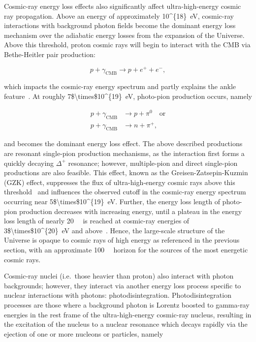 Cosmic-ray energy loss effects also significantly affect ultra-high-energy cosmic ray propagation.
Above an energy of approximately \qty[parse-numbers=false]{10^{18}}{\electronvolt}, cosmic-ray interactions with background photon fields become the dominant energy loss mechanism over the adiabatic energy losses from the expansion of the Universe.
Above this threshold, proton cosmic rays will begin to interact with the CMB via Bethe-Heitler pair production:

\begin{equation}
  p + \gamma_{\text{CMB}} \rightarrow p + e^{+} + e^{-}, \label{eq:cmb_pairproduction}
\end{equation}

\noindent
which impacts the cosmic-ray energy spectrum and partly explains the ankle feature~\cite{blumenthal_prd1970}.
At roughly \qty[parse-numbers=false]{7$\times$10^{19}}{\electronvolt}, photo-pion production occurs, namely

\begin{align}
  p + \gamma_{\text{CMB}} & \rightarrow p + \pi^{0}  \quad \text{or} \nonumber\\
  p + \gamma_{\text{CMB}} & \rightarrow n + \pi^{+}, \label{eq:cmb_photopion}
\end{align}

\noindent
and becomes the dominant energy loss effect.
The above described productions are resonant single-pion production mechanisms, as the interaction first forms a quickly decaying $\Delta^{+}$ resonance; however, multiple-pion and direct single-pion productions are also feasible.
This effect, known as the Greisen-Zatsepin-Kuzmin (GZK) effect, suppresses the flux of ultra-high-energy cosmic rays above this threshold~\cite{greisen_prl1966_gzk, zatsepin_jetp1966_gzk} and influences the observed cutoff in the cosmic-ray energy spectrum occurring near \qty[parse-numbers=false]{5$\times$10^{19}}{\electronvolt}.
Further, the energy loss length of photo-pion production decreases with increasing energy, until a plateau in the energy loss length of nearly \qty{20}{\mega\parsec} is reached at cosmic-ray energies of \qty[parse-numbers=false]{3$\times$10^{20}}{\electronvolt} and above~\cite{allard_astropartphys2011_propagation}.
Hence, the large-scale structure of the Universe is opaque to cosmic rays of high energy as referenced in the previous section, with an approximate \qty{100}{\mega\parsec} horizon for the sources of the most energetic cosmic rays.

Cosmic-ray nuclei (i.e.~those heavier than proton) also interact with photon backgrounds; however, they interact via another energy loss process specific to nuclear interactions with photons: photodisintegration.
Photodisintegration processes are those where a background photon is Lorentz boosted to gamma-ray energies in the rest frame of the ultra-high-energy cosmic-ray nucleus, resulting in the excitation of the nucleus to a nuclear resonance which decays rapidly via the ejection of one or more nucleons or particles, namely

